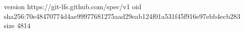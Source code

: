 version https://git-lfs.github.com/spec/v1
oid sha256:70e48470774d4ae99977681275aad29eab124f01a531f45f916e97ebb4ecb283
size 4814
